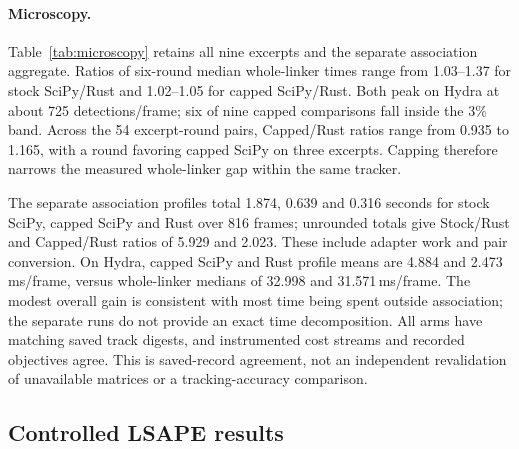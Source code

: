 \documentclass[11pt,a4paper]{article}
\begin{document}
\paragraph{Microscopy.}
Table~\ref{tab:microscopy} retains all nine excerpts and the separate association aggregate. Ratios of six-round median whole-linker times range from 1.03--1.37 for stock SciPy/Rust and 1.02--1.05 for capped SciPy/Rust. Both peak on Hydra at about 725 detections/frame; six of nine capped comparisons fall inside the 3\% band. Across the 54 excerpt-round pairs, Capped/Rust ratios range from 0.935 to 1.165, with a round favoring capped SciPy on three excerpts. Capping therefore narrows the measured whole-linker gap within the same tracker.

The separate association profiles total 1.874, 0.639 and 0.316 seconds for stock SciPy, capped SciPy and Rust over 816 frames; unrounded totals give Stock/Rust and Capped/Rust ratios of 5.929 and 2.023. These include adapter work and pair conversion. On Hydra, capped SciPy and Rust profile means are 4.884 and 2.473\,ms/frame, versus whole-linker medians of 32.998 and 31.571\,ms/frame. The modest overall gain is consistent with most time being spent outside association; the separate runs do not provide an exact time decomposition. All arms have matching saved track digests, and instrumented cost streams and recorded objectives agree. This is saved-record agreement, not an independent revalidation of unavailable matrices or a tracking-accuracy comparison.

\begin{table}[!htbp]
\centering
\caption{Microscopy. Counts give the mean number of detections per frame. Linker times are medians of six whole-clip means with prepared detections. Association totals come from one separate instrumented run per method and excerpt, including the adapter, solver and pair conversion. Ratios use unrounded totals. Stock and Capped denote the two SciPy configurations.}
\label{tab:microscopy}

\end{table}

\FloatBarrier
\subsection{Controlled LSAPE results}\label{sec:lsape-results}
\end{document}
